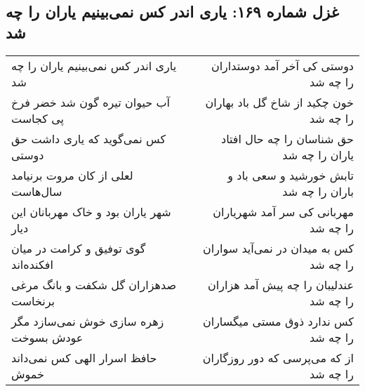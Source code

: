 \begin{center}
\section*{غزل شماره ۱۶۹: یاری اندر کس نمی‌بینیم یاران را چه شد}
\label{sec:sh169}
\begin{longtable}{l p{0.5cm} r}
یاری اندر کس نمی‌بینیم یاران را چه شد
&&
دوستی کی آخر آمد دوستداران را چه شد
\\
آب حیوان تیره گون شد خضر فرخ پی کجاست
&&
خون چکید از شاخ گل باد بهاران را چه شد
\\
کس نمی‌گوید که یاری داشت حق دوستی
&&
حق شناسان را چه حال افتاد یاران را چه شد
\\
لعلی از کان مروت برنیامد سال‌هاست
&&
تابش خورشید و سعی باد و باران را چه شد
\\
شهر یاران بود و خاک مهربانان این دیار
&&
مهربانی کی سر آمد شهریاران را چه شد
\\
گوی توفیق و کرامت در میان افکنده‌اند
&&
کس به میدان در نمی‌آید سواران را چه شد
\\
صدهزاران گل شکفت و بانگ مرغی برنخاست
&&
عندلیبان را چه پیش آمد هزاران را چه شد
\\
زهره سازی خوش نمی‌سازد مگر عودش بسوخت
&&
کس ندارد ذوق مستی میگساران را چه شد
\\
حافظ اسرار الهی کس نمی‌داند خموش
&&
از که می‌پرسی که دور روزگاران را چه شد
\\
\end{longtable}
\end{center}
